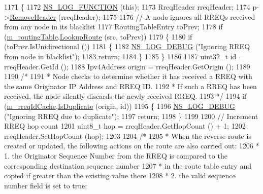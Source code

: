 \begin{DoxyCode}
1171 \{
1172   \hyperlink{log-macros-disabled_8h_a90b90d5bad1f39cb1b64923ea94c0761}{NS\_LOG\_FUNCTION} (\textcolor{keyword}{this});
1173   RreqHeader rreqHeader;
1174   p->\hyperlink{classns3_1_1Packet_a0961eccf975d75f902d40956c93ba63e}{RemoveHeader} (rreqHeader);
1175 
1176   \textcolor{comment}{// A node ignores all RREQs received from any node in its blacklist}
1177   RoutingTableEntry toPrev;
1178   \textcolor{keywordflow}{if} (\hyperlink{classns3_1_1aodv_1_1RoutingProtocol_a4e1003a34c8adc96db71096d88c98ae0}{m\_routingTable}.\hyperlink{classns3_1_1aodv_1_1RoutingTable_a90cbc8a2c65cd68ccdaf768fcbb5d723}{LookupRoute} (src, toPrev))
1179     \{
1180       \textcolor{keywordflow}{if} (toPrev.IsUnidirectional ())
1181         \{
1182           \hyperlink{group__logging_ga413f1886406d49f59a6a0a89b77b4d0a}{NS\_LOG\_DEBUG} (\textcolor{stringliteral}{"Ignoring RREQ from node in blacklist"});
1183           \textcolor{keywordflow}{return};
1184         \}
1185     \}
1186 
1187   uint32\_t \textcolor{keywordtype}{id} = rreqHeader.GetId ();
1188   Ipv4Address origin = rreqHeader.GetOrigin ();
1189 
1190   \textcolor{comment}{/*}
1191 \textcolor{comment}{   *  Node checks to determine whether it has received a RREQ with the same Originator IP Address and RREQ
       ID.}
1192 \textcolor{comment}{   *  If such a RREQ has been received, the node silently discards the newly received RREQ.}
1193 \textcolor{comment}{   */}
1194   \textcolor{keywordflow}{if} (\hyperlink{classns3_1_1aodv_1_1RoutingProtocol_a96743ff957b0a878c23e55a84e209d5d}{m\_rreqIdCache}.\hyperlink{classns3_1_1aodv_1_1IdCache_a6f32458e4f47ab3d977d8c81742b172c}{IsDuplicate} (origin, \textcolor{keywordtype}{id}))
1195     \{
1196       \hyperlink{group__logging_ga413f1886406d49f59a6a0a89b77b4d0a}{NS\_LOG\_DEBUG} (\textcolor{stringliteral}{"Ignoring RREQ due to duplicate"});
1197       \textcolor{keywordflow}{return};
1198     \}
1199 
1200   \textcolor{comment}{// Increment RREQ hop count}
1201   uint8\_t hop = rreqHeader.GetHopCount () + 1;
1202   rreqHeader.SetHopCount (hop);
1203 
1204   \textcolor{comment}{/*}
1205 \textcolor{comment}{   *  When the reverse route is created or updated, the following actions on the route are also carried
       out:}
1206 \textcolor{comment}{   *  1. the Originator Sequence Number from the RREQ is compared to the corresponding destination sequence
       number}
1207 \textcolor{comment}{   *     in the route table entry and copied if greater than the existing value there}
1208 \textcolor{comment}{   *  2. the valid sequence number field is set to true;}

\end{DoxyCode}
